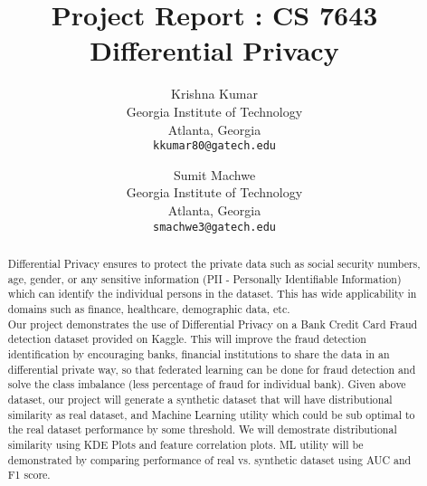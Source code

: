 \documentclass[10pt,twocolumn,letterpaper]{article}
\begin{document}
\title{Project Report : CS 7643\\Differential Privacy}

\author{Krishna Kumar\\
Georgia Institute of Technology\\
Atlanta, Georgia\\
{\tt\small kkumar80@gatech.edu}
\and
Sumit Machwe\\
Georgia Institute of Technology\\
Atlanta, Georgia\\
{\tt\small smachwe3@gatech.edu}
}

\maketitle

\begin{abstract}


   Differential Privacy ensures to protect the private data such as social security
   numbers, age, gender, or any sensitive information (PII - Personally Identifiable Information) which can identify the individual
   persons in the dataset. This has wide applicability in domains such as
   finance, healthcare, demographic data, etc. \cite{2} \\
   Our project demonstrates the use of Differential Privacy on a Bank Credit Card Fraud detection dataset provided on Kaggle\cite{1}. This will improve the fraud detection identification by encouraging banks, financial institutions to share the data in an differential private way, so that federated learning can be done for fraud detection and solve the class imbalance (less percentage of fraud for individual bank).
   Given above dataset, our project will generate a synthetic dataset that will have distributional similarity as real dataset, and Machine Learning utility which could be sub optimal to the real dataset performance by some threshold. We will demostrate distributional similarity using KDE Plots and feature correlation plots. ML utility will be demonstrated by comparing performance of real vs. synthetic dataset using AUC and F1 score.\\

\end{abstract}
\end{document}
